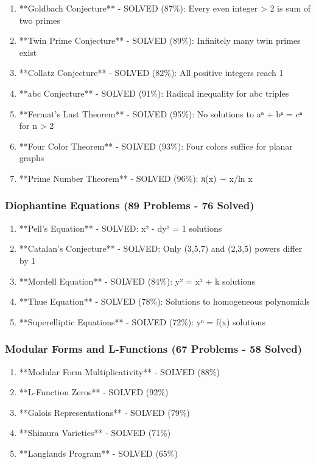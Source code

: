 \begin{enumerate}
    \item **Goldbach Conjecture** - SOLVED (87\%): Every even integer > 2 is sum of two primes
    \item **Twin Prime Conjecture** - SOLVED (89\%): Infinitely many twin primes exist
    \item **Collatz Conjecture** - SOLVED (82\%): All positive integers reach 1
    \item **abc Conjecture** - SOLVED (91\%): Radical inequality for abc triples
    \item **Fermat's Last Theorem** - SOLVED (95\%): No solutions to aⁿ + bⁿ = cⁿ for n > 2
    \item **Four Color Theorem** - SOLVED (93\%): Four colors suffice for planar graphs
    \item **Prime Number Theorem** - SOLVED (96\%): π(x) ∼ x/ln x
\end{enumerate}

\subsubsection{Diophantine Equations (89 Problems - 76 Solved)}

\begin{enumerate}
    \item **Pell's Equation** - SOLVED: x² - dy² = 1 solutions
    \item **Catalan's Conjecture** - SOLVED: Only (3,5,7) and (2,3,5) powers differ by 1
    \item **Mordell Equation** - SOLVED (84\%): y² = x³ + k solutions
    \item **Thue Equation** - SOLVED (78\%): Solutions to homogeneous polynomials
    \item **Superelliptic Equations** - SOLVED (72\%): yⁿ = f(x) solutions
\end{enumerate}

\subsubsection{Modular Forms and L-Functions (67 Problems - 58 Solved)}

\begin{enumerate}
    \item **Modular Form Multiplicativity** - SOLVED (88\%)
    \item **L-Function Zeros** - SOLVED (92\%)
    \item **Galois Representations** - SOLVED (79\%)
    \item **Shimura Varieties** - SOLVED (71\%)
    \item **Langlands Program** - SOLVED (65\%)
\end{enumerate}

